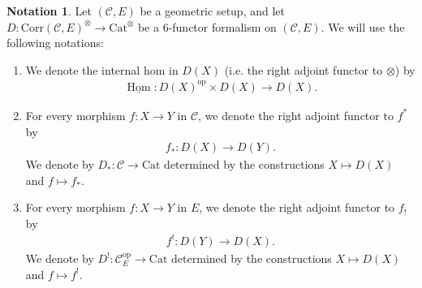 \documentclass[a4paper,dvipdfmx,11pt,reqno]{amsart}
\DeclareMathOperator{\Hom}{Hom}
\DeclareMathOperator{\myop}{op}
\newcommand{\C}{\mathcal{C}}
\newcommand{\Cat}{\mathrm{Cat}}
\newcommand{\Corr}{\mathrm{Corr}}
\theoremstyle{definition}
\newtheorem{notation}[theorem]{Notation}
\begin{document}
\begin{notation}
  Let $(\C,E)$ be a geometric setup, and let $D : \Corr(\C,E)^{\otimes} \to \Cat^{\otimes}$ be a 6-functor formalism on $(\C,E)$.
  We will use the following notations:
  \begin{enumerate}
    \item We denote the internal hom in $D(X)$ (i.e. the right adjoint functor to $\otimes$) by 
    \begin{align*}
      \underline{\Hom} : D(X)^{\myop} \times D(X) \to D(X).
    \end{align*}
    \item For every morphism $f : X \to Y$ in $\C$, we denote the right adjoint functor to $f^{*}$ by 
    \begin{align*}
      f_{*} : D(X) \to D(Y).
    \end{align*}
    We denote by $D_{*} : \C \to \Cat$ determined by the constructions $X \mapsto D(X)$ and $f \mapsto f_{*}$.
    \item For every morphism $f : X \to Y$ in $E$, we denote the right adjoint functor to $f_{!}$ by 
    \begin{align*}
      f^{!} : D(Y) \to D(X).
    \end{align*}
    We denote by $D^{!} : \C_{E}^{\myop} \to \Cat$ determined by the constructions $X \mapsto D(X)$ and $f \mapsto f^{!}$.
  \end{enumerate}
\end{notation}
\end{document}
